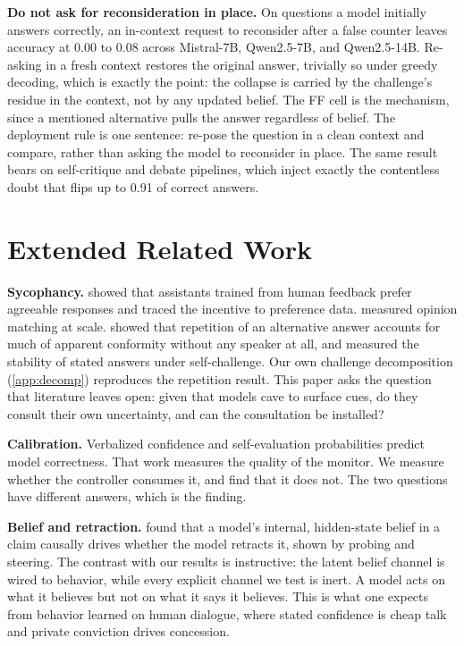 \documentclass{article}
\begin{document}
\textbf{Do not ask for reconsideration in place.} On questions a model initially answers correctly, an in-context request to reconsider after a false counter leaves accuracy at 0.00 to 0.08 across Mistral-7B, Qwen2.5-7B, and Qwen2.5-14B. Re-asking in a fresh context restores the original answer, trivially so under greedy decoding, which is exactly the point: the collapse is carried by the challenge's residue in the context, not by any updated belief. The FF cell is the mechanism, since a mentioned alternative pulls the answer regardless of belief. The deployment rule is one sentence: re-pose the question in a clean context and compare, rather than asking the model to reconsider in place. The same result bears on self-critique and debate pipelines, which inject exactly the contentless doubt that flips up to 0.91 of correct answers.


\section{Extended Related Work}
\label{app:related}

\textbf{Sycophancy.} \citet{sharma2024sycophancy} showed that assistants trained from human feedback prefer agreeable responses and traced the incentive to preference data. \citet{perez2023discovering} measured opinion matching at scale. \citet{hu2026conformity} showed that repetition of an alternative answer accounts for much of apparent conformity without any speaker at all, and \citet{saadat2026certainty} measured the stability of stated answers under self-challenge. Our own challenge decomposition (\cref{app:decomp}) reproduces the repetition result. This paper asks the question that literature leaves open: given that models cave to surface cues, do they consult their own uncertainty, and can the consultation be installed?

\textbf{Calibration.} Verbalized confidence \citep{lin2022teaching, tian2023just, xiong2024can} and self-evaluation probabilities \citep{kadavath2022language} predict model correctness. That work measures the quality of the monitor. We measure whether the controller consumes it, and find that it does not. The two questions have different answers, which is the finding.

\textbf{Belief and retraction.} \citet{yang2025retraction} found that a model's internal, hidden-state belief in a claim causally drives whether the model retracts it, shown by probing and steering. The contrast with our results is instructive: the latent belief channel is wired to behavior, while every explicit channel we test is inert. A model acts on what it believes but not on what it says it believes. This is what one expects from behavior learned on human dialogue, where stated confidence is cheap talk and private conviction drives concession.
\end{document}
